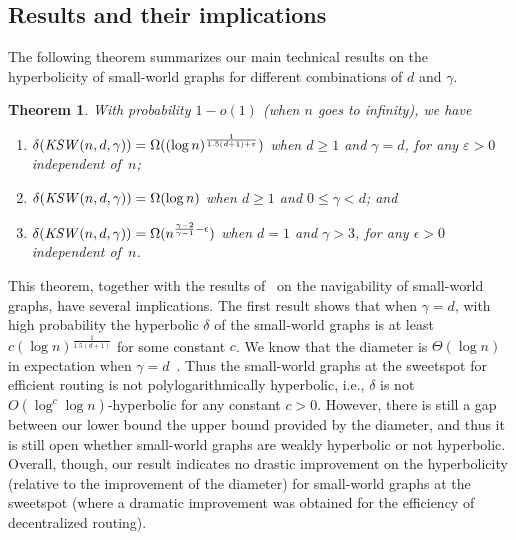 \documentclass[11pt]{article}
\newtheorem{thm}{Theorem}
\def\KSW{{\it KSW }}
\begin{document}



\subsection{Results and their implications} \label{sec:swresult}

The following theorem summarizes our main technical results on the 
hyperbolicity of small-world graphs for different combinations of $d$ and 
$\gamma$.

\begin{thm} \label{thm:main}
With probability $1- o(1)$ (when $n$ goes to infinity), we have
\begin{enumerate}
\item
$\delta(\KSW(n, d, \gamma)) = \Omega((\log n)^{\frac{1}{1.5(d+1)+\varepsilon}})$
	when $d\ge 1$ and $\gamma = d$, for any $\varepsilon>0$
	independent of~$n$;
\item
$\delta(\KSW(n, d, \gamma)) = \Omega(\log n)$ when   
	$d\ge 1$ and $0\le \gamma < d$; and
\item
$\delta(\KSW(n, d, \gamma)) = \Omega(n^{\frac{\gamma-2}{\gamma-1}-\epsilon})$ 
	when $d=1$ and
	$\gamma > 3$, 
        for any 
        $\epsilon > 0$ independent of~$n$.
\end{enumerate}
\end{thm}

This theorem, together with the results of~\cite{Kle00} on the navigability of
small-world graphs, have several implications.
The first result shows that when $\gamma = d$, 
	with high probability the hyperbolic
	$\delta$ of the small-world graphs is at least
	$c(\log n)^{\frac{1}{1.5(d+1)}}$ for some constant $c$.
We know that the diameter is $\Theta(\log n)$ in expectation
	when $\gamma=d$~\cite{MN04}.
Thus the small-world graphs at the sweetspot for efficient routing is not 
polylogarithmically hyperbolic, i.e., $\delta$ is not $O(\log^c\log n)$-hyperbolic for
any constant $c>0$.
However, there is still a gap between our lower bound the upper bound 
provided by the diameter, and thus it is still open whether small-world 
graphs are weakly hyperbolic or not hyperbolic.
Overall, though, our result indicates no drastic improvement on the 
hyperbolicity (relative to the improvement of the diameter) for small-world 
graphs at the sweetspot (where a dramatic improvement was obtained for the
efficiency of decentralized routing).
\end{document}

